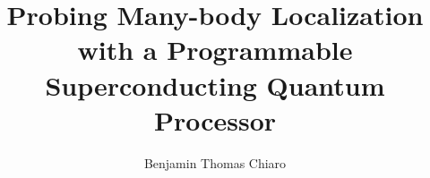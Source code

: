 \title{Probing Many-body Localization with a Programmable Superconducting Quantum Processor}
\author{Benjamin Thomas Chiaro}


